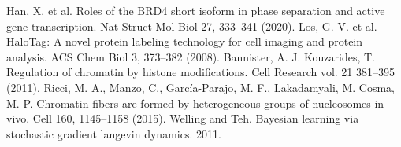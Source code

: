 \documentclass{ucetd}
\begin{document}
\noindent [26] Han, X. et al. Roles of the BRD4 short isoform in phase separation and active gene transcription. Nat Struct Mol Biol 27, 333–341 (2020). 
\newline
\noindent [27] Los, G. V. et al. HaloTag: A novel protein labeling technology for cell imaging and protein analysis. ACS Chem Biol 3, 373–382 (2008). 
\newline
\noindent [28] Bannister, A. J. Kouzarides, T. Regulation of chromatin by histone modifications. Cell Research vol. 21 381–395 (2011). 
\newline
\noindent [29] Ricci, M. A., Manzo, C., García-Parajo, M. F., Lakadamyali, M. Cosma, M. P. Chromatin fibers are formed by heterogeneous groups of nucleosomes in vivo. Cell 160, 1145–1158 (2015). 
\newline
\noindent [30] Welling and Teh. Bayesian learning via stochastic gradient langevin dynamics. 2011.
\newline
\end{document}
